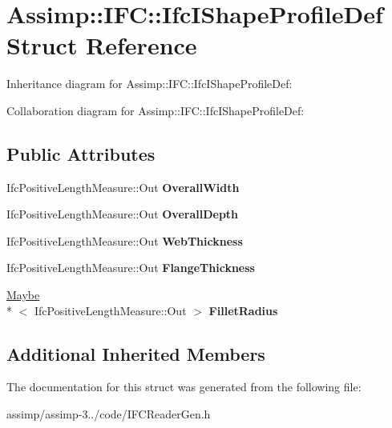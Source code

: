 \hypertarget{struct_assimp_1_1_i_f_c_1_1_ifc_i_shape_profile_def}{\section{Assimp\+:\+:I\+F\+C\+:\+:Ifc\+I\+Shape\+Profile\+Def Struct Reference}
\label{struct_assimp_1_1_i_f_c_1_1_ifc_i_shape_profile_def}
}


Inheritance diagram for Assimp\+:\+:I\+F\+C\+:\+:Ifc\+I\+Shape\+Profile\+Def\+:


Collaboration diagram for Assimp\+:\+:I\+F\+C\+:\+:Ifc\+I\+Shape\+Profile\+Def\+:
\subsection*{Public Attributes}
\begin{DoxyCompactItemize}
\item 
\hypertarget{struct_assimp_1_1_i_f_c_1_1_ifc_i_shape_profile_def_ae610e4a866470e933d265d3ed731ef30}{Ifc\+Positive\+Length\+Measure\+::\+Out {\bfseries Overall\+Width}}\label{struct_assimp_1_1_i_f_c_1_1_ifc_i_shape_profile_def_ae610e4a866470e933d265d3ed731ef30}

\item 
\hypertarget{struct_assimp_1_1_i_f_c_1_1_ifc_i_shape_profile_def_aba324e7ecadcf7df96817bc50f5a2090}{Ifc\+Positive\+Length\+Measure\+::\+Out {\bfseries Overall\+Depth}}\label{struct_assimp_1_1_i_f_c_1_1_ifc_i_shape_profile_def_aba324e7ecadcf7df96817bc50f5a2090}

\item 
\hypertarget{struct_assimp_1_1_i_f_c_1_1_ifc_i_shape_profile_def_ae628dbfe617a43de0c8ac6ccec09cd70}{Ifc\+Positive\+Length\+Measure\+::\+Out {\bfseries Web\+Thickness}}\label{struct_assimp_1_1_i_f_c_1_1_ifc_i_shape_profile_def_ae628dbfe617a43de0c8ac6ccec09cd70}

\item 
\hypertarget{struct_assimp_1_1_i_f_c_1_1_ifc_i_shape_profile_def_a9f1da6e9e2ea049c52dcf457686ad411}{Ifc\+Positive\+Length\+Measure\+::\+Out {\bfseries Flange\+Thickness}}\label{struct_assimp_1_1_i_f_c_1_1_ifc_i_shape_profile_def_a9f1da6e9e2ea049c52dcf457686ad411}

\item 
\hypertarget{struct_assimp_1_1_i_f_c_1_1_ifc_i_shape_profile_def_a2b88ae784eaa2e226549ea0c3ab96476}{\hyperlink{struct_assimp_1_1_s_t_e_p_1_1_maybe}{Maybe}\\*
$<$ Ifc\+Positive\+Length\+Measure\+::\+Out $>$ {\bfseries Fillet\+Radius}}\label{struct_assimp_1_1_i_f_c_1_1_ifc_i_shape_profile_def_a2b88ae784eaa2e226549ea0c3ab96476}

\end{DoxyCompactItemize}
\subsection*{Additional Inherited Members}


The documentation for this struct was generated from the following file\+:\begin{DoxyCompactItemize}
\item 
assimp/assimp-\/3../code/I\+F\+C\+Reader\+Gen.\+h\end{DoxyCompactItemize}
